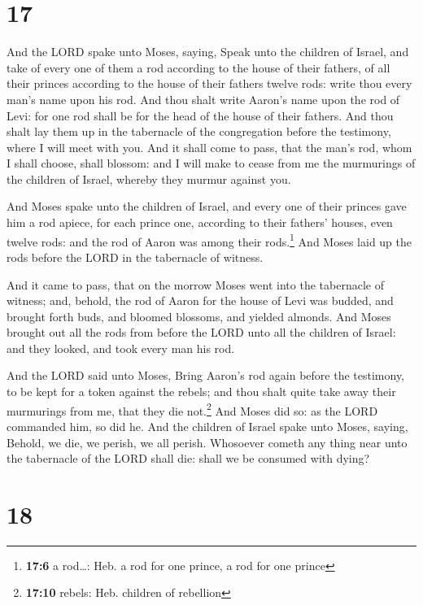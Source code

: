 \hypertarget{section-16}{%
\section{17}\label{section-16}}

 And the LORD spake unto Moses, saying, 
Speak unto the children of Israel, and take of every one of them a rod
according to the house of their fathers, of all their princes according
to the house of their fathers twelve rods: write thou every man's name
upon his rod.  And thou shalt write Aaron's name upon the
rod of Levi: for one rod shall be for the head of the house of their
fathers.  And thou shalt lay them up in the tabernacle of
the congregation before the testimony, where I will meet with you.
 And it shall come to pass, that the man's rod, whom I
shall choose, shall blossom: and I will make to cease from me the
murmurings of the children of Israel, whereby they murmur against you.

 And Moses spake unto the children of Israel, and every
one of their princes gave him a rod apiece, for each prince one,
according to their fathers' houses, even twelve rods: and the rod of
Aaron was among their rods.\footnote{\textbf{17:6} a rod\ldots: Heb. a
  rod for one prince, a rod for one prince}  And Moses
laid up the rods before the LORD in the tabernacle of witness.

 And it came to pass, that on the morrow Moses went into
the tabernacle of witness; and, behold, the rod of Aaron for the house
of Levi was budded, and brought forth buds, and bloomed blossoms, and
yielded almonds.  And Moses brought out all the rods from
before the LORD unto all the children of Israel: and they looked, and
took every man his rod.

 And the LORD said unto Moses, Bring Aaron's rod again
before the testimony, to be kept for a token against the rebels; and
thou shalt quite take away their murmurings from me, that they die
not.\footnote{\textbf{17:10} rebels: Heb. children of rebellion}
 And Moses did so: as the LORD commanded him, so did he.
 And the children of Israel spake unto Moses, saying,
Behold, we die, we perish, we all perish.  Whosoever
cometh any thing near unto the tabernacle of the LORD shall die: shall
we be consumed with dying?

\hypertarget{section-17}{%
\section{18}\label{section-17}}


